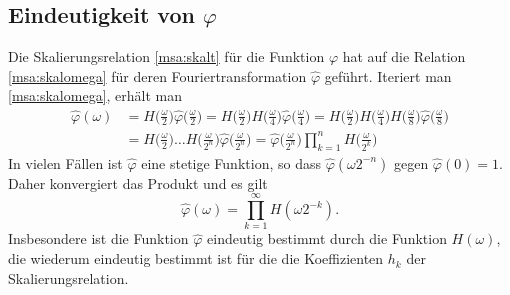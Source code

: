 \subsection{Eindeutigkeit von $\varphi$}
Die Skalierungsrelation \eqref{msa:skalt} für die Funktion $\varphi$ hat auf
die Relation \eqref{msa:skalomega} für deren Fouriertransformation
$\hat{\varphi}$ geführt.
Iteriert man \eqref{msa:skalomega}, erhält man
\begin{align*}
\hat{\varphi}(\omega)
&=
H\biggl(\frac{\omega}2\biggr)
\hat{\varphi}\biggl(\frac{\omega}2\biggr)
=
H\biggl(\frac{\omega}2\biggr)
H\biggl(\frac{\omega}4\biggr)
\hat{\varphi}\biggl(\frac{\omega}4\biggr)
=
H\biggl(\frac{\omega}2\biggr)
H\biggl(\frac{\omega}4\biggr)
H\biggl(\frac{\omega}8\biggr)
\hat{\varphi}\biggl(\frac{\omega}8\biggr)
\\
&=
H\biggl(\frac{\omega}2\biggr)
\dots
H\biggl(\frac{\omega}{2^n}\biggr)
\hat{\varphi}\biggl(\frac{\omega}{2^n}\biggr)
=
\hat{\varphi}\biggl(\frac{\omega}{2^n}\biggr)
\prod_{k=1}^n 
H\biggl(\frac{\omega}{2^k}\biggr)
\end{align*}
In vielen Fällen ist $\hat{\varphi}$ eine stetige Funktion, so dass
$\hat{\varphi}(\omega 2^{-n})$ gegen $\hat{\varphi}(0)=1$.
Daher konvergiert das Produkt und es gilt
\[
\hat{\varphi}(\omega) = \prod_{k=1}^\infty H(\omega 2^{-k}).
\]
Insbesondere ist die Funktion $\hat{\varphi}$ eindeutig bestimmt 
durch die Funktion $H(\omega)$, die wiederum eindeutig bestimmt ist
für die die Koeffizienten $h_k$ der Skalierungsrelation.


%
% 
%
